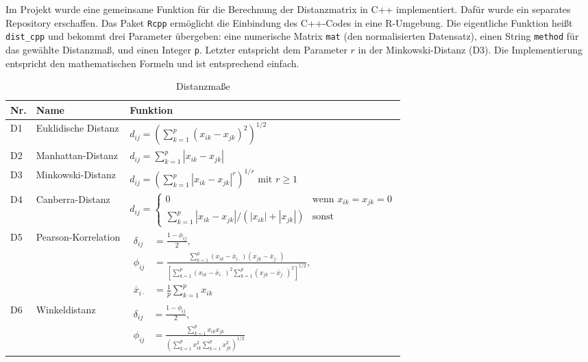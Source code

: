 \documentclass[12pt]{article}
\begin{document}
Im Projekt wurde eine gemeinsame Funktion für die Berechnung der Distanzmatrix in C++ implementiert. Dafür wurde ein separates Repository erschaffen. Das Paket \verb*|Rcpp| \cite{Eddelbuettel2026} ermöglicht die Einbindung des C++-Codes in eine R-Umgebung. Die eigentliche Funktion heißt \verb*|dist_cpp| und bekommt drei Parameter übergeben: eine numerische Matrix \verb*|mat| (den normalisierten Datensatz), einen String \verb*|method| für das gewählte Distanzmaß, und einen Integer \verb*|p|. Letzter entspricht dem Parameter \(r\) in der Minkowski-Distanz (D3). Die Implementierung entspricht den mathematischen Formeln und ist entsprechend einfach.

\begin{table}[ht]
	\centering
	\renewcommand{\arraystretch}{1.3}
	\begin{tabularx}{\textwidth}{l >{\raggedright\arraybackslash}p{3cm} X}
		\toprule
		Nr. & Name & Funktion \\
		\midrule
		D1  & Euklidische Distanz & $ d_{ij} = \left( \sum_{k=1}^{p} (x_{ik} - x_{jk})^2 \right)^{1/2} $\\
		\midrule
		D2  & Manhattan-Distanz   & $ d_{ij} =  \sum_{k=1}^{p} |x_{ik} - x_{jk}| $ \\
		\midrule
		D3  & Minkowski-Distanz   & $ d_{ij} = \left( \sum_{k=1}^{p} |x_{ik} - x_{jk}|^r \right)^{1/r} \text{ mit } r \ge 1 $ \\
		\midrule
		D4  & Canberra-Distanz    & $ d_{ij} = \begin{cases}
													0 & \text{wenn }x_{ik} = x_{jk} = 0\\
													\sum_{k=1}^{p} |x_{ik} - x_{jk}|/(|x_{ik}| + |x_{jk}|)  & \text{sonst}
									\end{cases}  $\\
									\midrule
		D5  & Pearson-Korrelation & $ \begin{aligned}
			\delta_{ij}
			&= \frac{1-\phi_{ij}}{2},
			\\[0.5ex]
			\phi_{ij}
			&=
			\frac{
				\sum_{k=1}^{p}
				(x_{ik} - \bar{x}_{i\cdot})
				(x_{jk} - \bar{x}_{j\cdot})
			}{
				\left[
				\sum_{k=1}^{p}
				(x_{ik} - \bar{x}_{i\cdot})^2
				\sum_{k=1}^{p}
				(x_{jk} - \bar{x}_{j\cdot})^2
				\right]^{1/2}
			},
			\\[0.5ex]
			\bar{x}_{i\cdot}
			&=
			\frac{1}{p}\sum_{k=1}^{p} x_{ik}
		\end{aligned} $\\
		\midrule
		D6  & Winkeldistanz       & $ \begin{aligned}
			\delta_{ij}
			&= \frac{1-\phi_{ij}}{2},
			\\[0.5ex]
			\phi_{ij}
			&=
			\frac{
				\sum_{k=1}^{p} x_{ik}x_{jk}
			}{
				\left(
				\sum_{k=1}^{p} x_{ik}^2
				\sum_{k=1}^{p} x_{jk}^2
				\right)^{1/2}
			}
		\end{aligned} $ \\
		\bottomrule
	\end{tabularx}
	\caption{Distanzmaße}
	\label{distanzfunktionen-tabelle}
\end{table}
\end{document}
